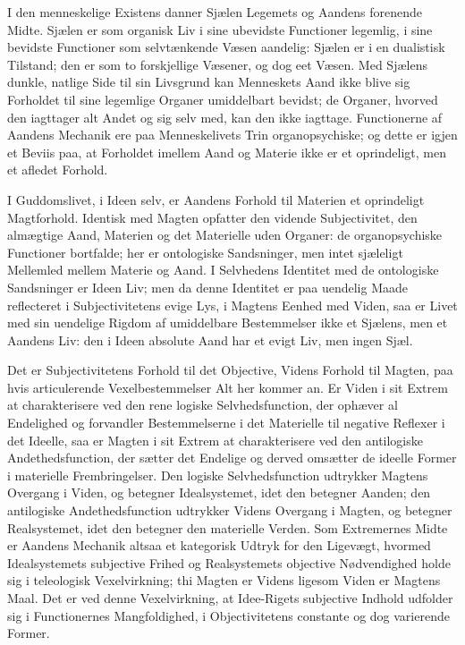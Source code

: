 \documentclass[12pt]{book}
\newcommand{\opage}[1]{\marginnote{\footnotesize\textit{[#1]}}}
\begin{document}
I den menneskelige Existens danner Sjælen Legemets og Aandens forenende Midte. Sjælen er som organisk
Liv i sine ubevidste Functioner legemlig, i sine bevidste Functioner som selvtænkende Væsen aandelig:
Sjælen er i en dualistisk Tilstand; den er som to forskjellige Væsener, og dog eet Væsen. Med Sjælens
dunkle, natlige Side til sin Livsgrund kan Menneskets Aand ikke blive sig Forholdet til sine
legemlige Organer umiddelbart bevidst; de Organer, hvorved den iagttager alt Andet og sig selv med,
kan den ikke iagttage. Functionerne af Aandens Mechanik ere paa Menneskelivets Trin organopsychiske;
og dette er igjen et Beviis paa, at Forholdet imellem Aand og Materie ikke er et oprindeligt, men et
afledet Forhold.

I Guddomslivet, i Ideen selv, er Aandens Forhold til Materien et oprindeligt Magtforhold. Identisk
med Magten opfatter den vidende Subjectivitet, den almægtige Aand, Materien og det Materielle uden
Organer: de organopsychiske Functioner bortfalde; her er ontologiske Sandsninger, men intet sjæleligt
Mellemled mellem Materie og Aand. I Selvhedens Identitet med de ontologiske Sandsninger er Ideen Liv;
men da denne Identitet er paa uendelig Maade reflecteret i Subjectivitetens evige Lys, i Magtens
Eenhed med Viden, saa er Livet med sin uendelige Rigdom af umiddelbare Bestemmelser ikke et Sjælens,
men et Aandens Liv: den i Ideen absolute Aand har et evigt Liv, men ingen Sjæl.

Det er Subjectivitetens Forhold til det Objective, Videns
\opage{427} Forhold til Magten, paa hvis articulerende Vexelbestemmelser Alt her kommer an. Er Viden i sit Extrem
at charakterisere ved den rene logiske Selvhedsfunction, der ophæver al Endelighed og forvandler
Bestemmelserne i det Materielle til negative Reflexer i det Ideelle, saa er Magten i sit Extrem at
charakterisere ved den antilogiske Andethedsfunction, der sætter det Endelige og derved omsætter de
ideelle Former i materielle Frembringelser. Den logiske Selvhedsfunction udtrykker Magtens Overgang i
Viden, og betegner Idealsystemet, idet den betegner Aanden; den antilogiske Andethedsfunction
udtrykker Videns Overgang i Magten, og betegner Realsystemet, idet den betegner den materielle
Verden. Som Extremernes Midte er Aandens Mechanik altsaa et kategorisk Udtryk for den Ligevægt,
hvormed Idealsystemets subjective Frihed og Realsystemets objective Nødvendighed holde sig i
teleologisk Vexelvirkning; thi Magten er Videns ligesom Viden er Magtens Maal. Det er ved denne
Vexelvirkning, at Idee-Rigets subjective Indhold udfolder sig i Functionernes Mangfoldighed, i
Objectivitetens constante og dog varierende Former.
\end{document}
